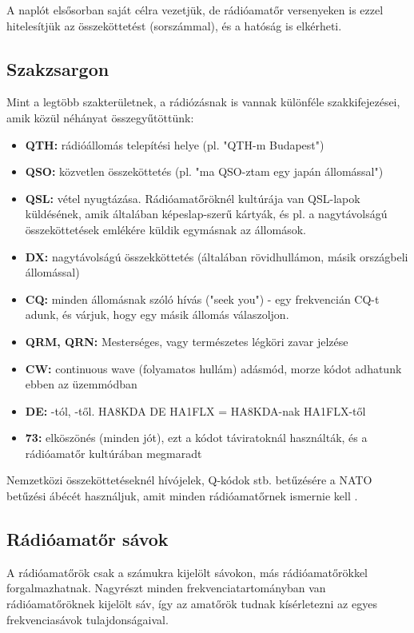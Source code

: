 \documentclass[12pt,a4paper]{article}
\begin{document}
A naplót elsősorban saját célra vezetjük, de rádióamatőr versenyeken is ezzel hitelesítjük az összeköttetést (sorszámmal), és a hatóság is elkérheti.

\subsection{Szakzsargon}

Mint a legtöbb szakterületnek, a rádiózásnak is vannak különféle szakkifejezései, amik közül néhányat összegyűtöttünk:

\begin{itemize}
\item \textbf{QTH:} rádióállomás telepítési helye (pl. "QTH-m Budapest")
\item \textbf{QSO:} közvetlen összeköttetés (pl. "ma QSO-ztam egy japán állomással")
\item \textbf{QSL:} vétel nyugtázása. Rádióamatőröknél kultúrája van QSL-lapok küldésének, amik általában képeslap-szerű kártyák, és pl. a nagytávolságú összeköttetések emlékére küldik egymásnak az állomások.
\item \textbf{DX:} nagytávolságú összekköttetés (általában rövidhullámon, másik országbeli állomással)
\item \textbf{CQ:} minden állomásnak szóló hívás ("seek you") - egy frekvencián CQ-t adunk, és várjuk, hogy egy másik állomás válaszoljon. 
\item \textbf{QRM, QRN:} Mesterséges, vagy természetes légköri zavar jelzése
\item \textbf{CW:} continuous wave (folyamatos hullám) adásmód, morze kódot adhatunk ebben az üzemmódban
\item \textbf{DE:} -tól, -től. HA8KDA DE HA1FLX = HA8KDA-nak HA1FLX-től
\item \textbf{73:} elköszönés (minden jót), ezt a kódot táviratoknál használták, és a rádióamatőr kultúrában megmaradt


\end{itemize}

Nemzetközi összeköttetéseknél hívójelek, Q-kódok stb. betűzésére a NATO betűzési ábécét használjuk, amit minden rádióamatőrnek ismernie kell \cite{nato}.

\subsection{Rádióamatőr sávok}

A rádióamatőrök csak a számukra kijelölt sávokon, más rádióamatőrökkel forgalmazhatnak. Nagyrészt minden frekvenciatartományban van rádióamatőröknek kijelölt sáv, így az amatőrök tudnak kísérletezni az egyes frekvenciasávok tulajdonságaival.
\end{document}
